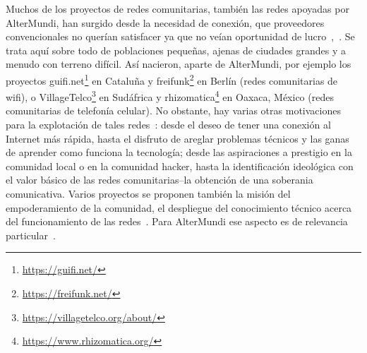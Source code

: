 \begin{comment}
características:
* infraestructura de comunicación decentralizada, creada y mantenida por la comunidad de lxs usuarixs (el estado/empresas grandes no pueden cerrarla tan facilmente) --> interesante sobre todo también para contextos autócratos (regimenes políticos antidemocráticos, vease Iran, China, Cuba, .. )
* garantizar acceso libre a información
* garantizar la libertad de expresión
* ..
* el firmware: software libre

\item infraestructura de comunicación abierta, accesible para tod@s
\item infraestructura creada y mantenida por la comunidad de l@s usuari@s

  \begin{itemize}
    \item conectar a comunidades excluidas por los proveedores convencionales de servicios Internet
    \item garantizar acceso libre a información
    \item garantizar la libertad de expreción
  \end{itemize}
\end{comment}

Muchos de los proyectos de redes comunitarias, también las redes apoyadas por AlterMundi, han surgido desde la necesidad de conexión, que proveedores convencionales no querían satisfacer ya que no veían oportunidad de lucro~\autocite{Piccoli2015},~\autocite{Vaseva2016a}.
Se trata aquí sobre todo de poblaciones pequeñas, ajenas de ciudades grandes y a menudo con terreno difícil.
Así nacieron, aparte de AlterMundi, por ejemplo los proyectos guifi.net\footnote{\url{https://guifi.net/}} en Cataluña y freifunk\footnote{\url{https://freifunk.net/}} en Berlín (redes comunitarias de wifi), o VillageTelco\footnote{\url{https://villagetelco.org/about/}} en Sudáfrica y rhizomatica\footnote{\url{https://www.rhizomatica.org/}} en Oaxaca, México (redes comunitarias de telefonía celular).
No obstante, hay varias otras motivaciones para la explotación de tales redes~\autocite{Vaseva2016b}:
desde el deseo de tener una conexión al Internet más rápida, hasta el disfruto de areglar problemas técnicos y las ganas de aprender como funciona la tecnología;
desde las aspiraciones a prestigio en la comunidad local o en la comunidad hacker, hasta la identificación ideológica con el valor básico de las redes comunitarias--la obtención de una soberania comunicativa.
Varios proyectos se proponen también la misión del empoderamiento de la comunidad, el despliegue del conocimiento técnico acerca del funcionamiento de las redes~\autocite{Vaseva2016b}.
Para AlterMundi ese aspecto es de relevancia particular~\autocite{Vaseva2016a}.


